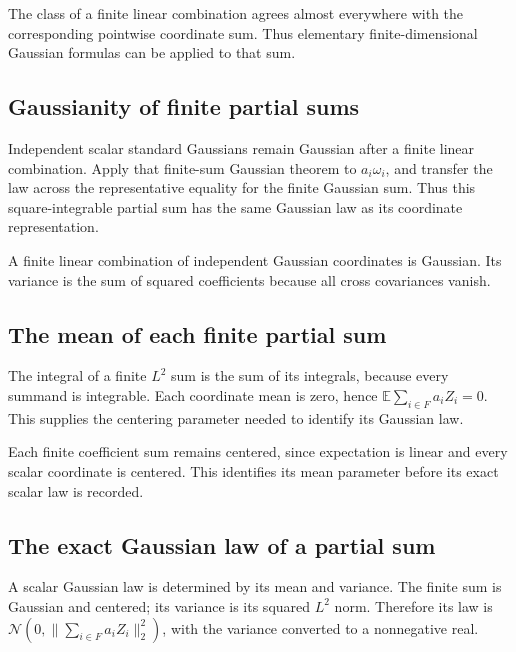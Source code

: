\documentclass[11pt,a4paper]{report}
\begin{document}
The class of a finite linear combination agrees almost everywhere with the corresponding pointwise coordinate sum. Thus elementary finite-dimensional Gaussian formulas can be applied to that sum.

\subsection{\texorpdfstring{Gaussianity of finite partial sums}{Gaussianity of finite partial sums}}
\label{report-step-UnadjustedLangevin-GaussianHilbert-lean-20}


Independent scalar standard Gaussians remain Gaussian after a finite linear combination. Apply that finite-sum Gaussian theorem to \(a_i\omega_i\), and transfer the law across the representative equality for the finite Gaussian sum. Thus this square-integrable partial sum has the same Gaussian law as its coordinate representation.



A finite linear combination of independent Gaussian coordinates is Gaussian. Its variance is the sum of squared coefficients because all cross covariances vanish.

\subsection{\texorpdfstring{The mean of each finite partial sum}{The mean of each finite partial sum}}
\label{report-step-UnadjustedLangevin-GaussianHilbert-lean-21}


The integral of a finite \(L^2\) sum is the sum of its integrals, because every summand is integrable. Each coordinate mean is zero, hence \(\mathbb E\sum_{i\in F}a_iZ_i=0\). This supplies the centering parameter needed to identify its Gaussian law.



Each finite coefficient sum remains centered, since expectation is linear and every scalar coordinate is centered. This identifies its mean parameter before its exact scalar law is recorded.

\subsection{\texorpdfstring{The exact Gaussian law of a partial sum}{The exact Gaussian law of a partial sum}}
\label{report-step-UnadjustedLangevin-GaussianHilbert-lean-22}


A scalar Gaussian law is determined by its mean and variance. The finite sum is Gaussian and centered; its variance is its squared \(L^2\) norm. Therefore its law is \(\mathcal N(0,\|\sum_{i\in F}a_iZ_i\|_2^2)\), with the variance converted to a nonnegative real.
\end{document}
